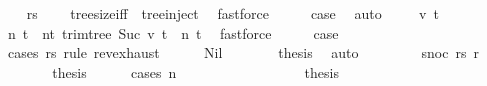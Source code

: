 \begin{isabellebody}
\ \ \isamarkupfalse%
\ {\isachardoublequoteopen}rs\ {\isacharequal}{\kern0pt}\ {\isacharbrackleft}{\kern0pt}{\isacharbrackright}{\kern0pt}{\isachardoublequoteclose}\ \isamarkupfalse%
\ tree{\isacharunderscore}{\kern0pt}size{\isacharunderscore}{\kern0pt}{}{\isacharunderscore}{\kern0pt}iff\ {}{\isacharparenleft}{\kern0pt}{}{\isacharparenright}{\kern0pt}\ tree{\isachardot}{\kern0pt}inject\ \isamarkupfalse%
\ fastforce\isanewline
\ \ \isamarkupfalse%
\ \isamarkupfalse%
\ {\isacharquery}{\kern0pt}case\ \isamarkupfalse%
\ auto\isanewline
{}\isamarkupfalse%
\isanewline
\ \ \isamarkupfalse%
\ {\isacharparenleft}{\kern0pt}{}\ v\ t{\isacharparenright}{\kern0pt}\isanewline
\ \ \isamarkupfalse%
\ n{\isacharprime}{\kern0pt}\ t{\isacharprime}{\kern0pt}\ \ nt{\isacharprime}{\kern0pt}{\isacharcolon}{\kern0pt}\ {\isachardoublequoteopen}trim{\isacharunderscore}{\kern0pt}tree\ {\isacharparenleft}{\kern0pt}Suc\ v{\isacharparenright}{\kern0pt}\ t\ {\isacharequal}{\kern0pt}\ {\isacharparenleft}{\kern0pt}n{\isacharprime}{\kern0pt}{\isacharcomma}{\kern0pt}\ t{\isacharprime}{\kern0pt}{\isacharparenright}{\kern0pt}{\isachardoublequoteclose}\ \isamarkupfalse%
\ fastforce\isanewline
\ \ \isamarkupfalse%
\ \isamarkupfalse%
\ {\isacharquery}{\kern0pt}case\isanewline
\ \ \isamarkupfalse%
\ {\isacharparenleft}{\kern0pt}cases\ rs\ rule{\isacharcolon}{\kern0pt}\ rev{\isacharunderscore}{\kern0pt}exhaust{\isacharparenright}{\kern0pt}\isanewline
\ \ \ \ \isamarkupfalse%
\ Nil\isanewline
\ \ \ \ \isamarkupfalse%
\ \isamarkupfalse%
\ {\isacharquery}{\kern0pt}thesis\ \isamarkupfalse%
\ auto\isanewline
\ \ \isamarkupfalse%
\isanewline
\ \ \ \ \isamarkupfalse%
\ {\isacharparenleft}{\kern0pt}snoc\ rs{\isacharprime}{\kern0pt}\ r{\isacharprime}{\kern0pt}{\isacharparenright}{\kern0pt}\isanewline
\ \ \ \ \isamarkupfalse%
\ \isamarkupfalse%
\ {\isacharquery}{\kern0pt}thesis\isanewline
\ \ \ \ \isamarkupfalse%
\ {\isacharparenleft}{\kern0pt}cases\ n{\isacharprime}{\kern0pt}{\isacharparenright}{\kern0pt}\isanewline
\ \ \ \ \ \ \isamarkupfalse%
\ {}\isanewline
\ \ \ \ \ \ \isamarkupfalse%
\ \isamarkupfalse%
\ {\isacharquery}{\kern0pt}thesis\isanewline

\end{isabellebody}
